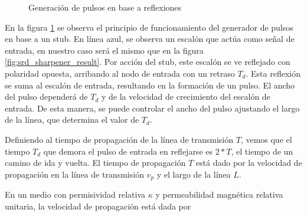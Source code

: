 \begin{figure}[h!]
    \centering
    \caption{Generación de pulsos en base a reflexiones}
    \label{fig:stub_time_domain_waveforms}
\end{figure}

En la figura \ref{fig:stub_time_domain_waveforms} se observa el principio de
funcionamiento del generador de pulsos en base a un stub. En línea azul, se
observa un escalón que actúa como señal de entrada, en nuestro caso será el
mismo que en la figura \ref{fig:srd_sharpener_result}. Por acción del stub, este
escalón se ve reflejado con polaridad opuesta, arribando al nodo de entrada con
un retraso $T_d$. Esta reflexión se suma al escalón de entrada, resultando en la
formación de un pulso. El ancho del pulso dependerá de $T_d$ y de la velocidad
de crecimiento del escalón de entrada. De esta manera, se puede controlar el
ancho del pulso ajustando el largo de la línea, que determina el valor de $T_d$.

Definiendo al tiempo de propagación de la línea de transmisión $T$, vemos que el
tiempo $T_d$ que demora el pulso de entrada en reflejarse es $2*T$, el tiempo de
un camino de ida y vuelta.  El tiempo de propagación $T$ está dado por la
velocidad de propagación en la línea de transmisión $v_p$ y el largo de la línea
$L$.

En un medio con permisividad relativa $\kappa$ y permeabilidad magnética
relativa unitaria, la velocidad de propagación está dada por \cite{pozar2011}

